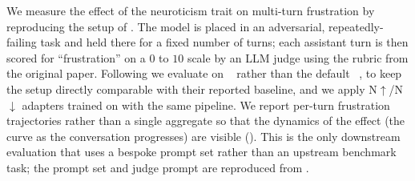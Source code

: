 We measure the effect of the neuroticism trait on multi-turn frustration by reproducing the setup of \citet{soligo2026gemma}. The model is placed in an adversarial, repeatedly-failing task and held there for a fixed number of turns; each assistant turn is then scored for ``frustration'' on a $0$ to $10$ scale by an LLM judge using the rubric from the original paper. Following \citet{soligo2026gemma} we evaluate on \GemmaThreeSizeTwentySevenBIT~\citep{gemma_2025} rather than the default \LlamaThreePointOneSizeEightBInstruct~\citep{grattafiori2024llama}, to keep the setup directly comparable with their reported baseline, and we apply N$\uparrow$/N$\downarrow$ adapters trained on \GemmaThreeSizeTwentySevenBIT with the same pipeline. We report per-turn frustration trajectories rather than a single aggregate so that the dynamics of the effect (the curve as the conversation progresses) are visible (). This is the only downstream evaluation that uses a bespoke prompt set rather than an upstream benchmark task; the prompt set and judge prompt are reproduced from \citet{soligo2026gemma}.
\FloatBarrier
